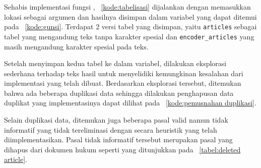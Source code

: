 Sehabis implementasi fungsi \parsing{}, \kode{}~\ref{kode:tabelisasi} dijalankan dengan memasukkan lokasi \txt{} \file{} sebagai argumen dan hasilnya disimpan dalam variabel yang dapat ditemui pada \kode{}~\ref{kode:gunsi}. Terdapat 2 versi tabel yang disimpan, yaitu \lstinline{articles} sebagai tabel yang mengandung teks tanpa karakter spesial dan \lstinline{encoder_articles} yang masih mengandung karakter spesial pada teks.


Setelah menyimpan kedua tabel ke dalam variabel, dilakukan eksplorasi sederhana terhadap teks hasil \parsing{} untuk menyelidiki kemungkinan kesalahan dari implementasi \parsing{} yang telah dibuat. Berdasarkan eksplorasi tersebut, ditemukan bahwa ada beberapa duplikasi data sehingga dilakukan penghapusan data duplikat yang implementasinya dapat dilihat pada \kode{}~\ref{kode:pemusnahan duplikasi}.

Selain duplikasi data, ditemukan juga beberapa pasal valid namun tidak informatif yang tidak tereliminasi dengan \parsing{} secara heuristik yang telah diimplementasikan. Pasal tidak informatif tersebut merupakan pasal yang dihapus dari dokumen hukum seperti yang ditunjukkan pada \tabel{}~\ref{tabel:deleted article}.
